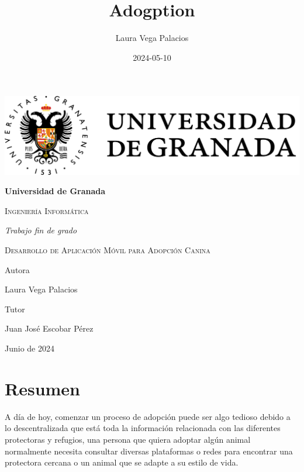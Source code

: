 \documentclass[a4paper, 12pt]{article}
\title{Adogption}
\date{2024-05-10}
\author{Laura Vega Palacios}
\begin{document}
\begin{titlepage}
	\pagestyle{plain}
	\centering
	{\includegraphics[width=1\textwidth]{logoUGR.png}\par}
	{\bfseries\LARGE Universidad de Granada \par}
	{\scshape\Large Ingeniería Informática \par}
	\vspace{0.5cm}
	{\itshape\Large Trabajo fin de grado \par}
	{\scshape\Huge Desarrollo de Aplicación Móvil para Adopción Canina \par}
	\vfill
	{\Large Autora \par}
	{\Large Laura Vega Palacios\par}

	{\Large Tutor \par}
	{\Large Juan José Escobar Pérez\par}
	\vfill
	{\Large Junio de 2024 \par}
\end{titlepage} 

\newpage
\thispagestyle{empty}
\mbox{}

\newpage
\pagestyle{plain}
\section*{Resumen}
A día de hoy, comenzar un proceso de adopción puede ser algo tedioso debido a lo descentralizada que está toda la información relacionada con las diferentes protectoras y refugios, una persona que quiera adoptar algún animal normalmente necesita consultar diversas plataformas o redes para encontrar una protectora cercana o un animal que se adapte a su estilo de vida.
\end{document}
